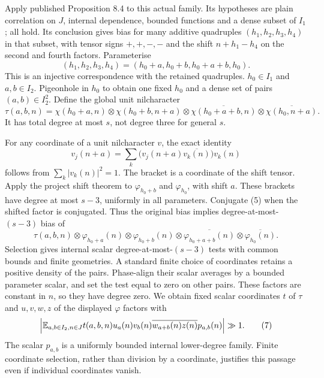 \documentclass[11pt]{article}
\begin{document}
Apply published Proposition 8.4 to this actual family. Its hypotheses are
plain correlation on $J$, internal dependence, bounded functions and a
dense subset of $I_1$; all hold. Its conclusion gives bias for many additive
quadruples $(h_1,h_2,h_3,h_4)$ in that subset, with tensor signs $+,+,-,-$
and the shift $n+h_1-h_4$ on the second and fourth factors. Parameterise
\[
 (h_1,h_2,h_3,h_4)=(h_0+a,h_0+b,h_0+a+b,h_0).
\]
This is an injective correspondence with the retained quadruples.
$h_0\in I_1$ and $a,b\in I_2$. Pigeonhole in $h_0$ to obtain one fixed
$h_0$ and a dense set of pairs $(a,b)\in I_2^2$.
Define the global unit nilcharacter
\[
 \tau(a,b,n)=\chi(h_0+a,n)\otimes\chi(h_0+b,n+a)
 \otimes\overline{\chi(h_0+a+b,n)}
 \otimes\overline{\chi(h_0,n+a)}.                         \tag{4}
\]
It has total degree at most $s$, not degree three for general $s$.

For any coordinate of a unit nilcharacter $v$, the exact identity
\[
 v_j(n+a)=\sum_k\bigl(v_j(n+a)\overline{v_k(n)}\bigr)v_k(n) \tag{5}
\]
follows from $\sum_k|v_k(n)|^2=1$. The bracket is a coordinate of the
shift tensor. Apply the project shift theorem to $\varphi_{h_0+b}$ and
$\varphi_{h_0}$, with shift $a$. These brackets have degree at most
$s-3$, uniformly in all parameters. Conjugate (5) when the shifted factor
is conjugated. Thus the original bias implies degree-at-most-$(s-3)$ bias
of
\[
 \tau(a,b,n)\otimes\varphi_{h_0+a}(n)\otimes\varphi_{h_0+b}(n)
 \otimes\overline{\varphi_{h_0+a+b}(n)}
 \otimes\overline{\varphi_{h_0}(n)}.                      \tag{6}
\]
Selection gives internal scalar degree-at-most-$(s-3)$ tests with common
bounds and finite geometries. A standard finite choice of coordinates
retains a positive density of the pairs. Phase-align their scalar averages
by a bounded parameter scalar, and set the test equal to zero on other
pairs. These factors are constant in $n$, so they have degree zero.
We obtain fixed scalar coordinates $t$ of $\tau$ and $u,v,w,z$ of the
displayed $\varphi$ factors with
\[
 \left|\mathbb E_{a,b\in I_2,n\in J}
 t(a,b,n)u_a(n)v_b(n)\overline{w_{a+b}(n)}\overline{z(n)}
 p_{a,b}(n)\right|\gg1.                                 \tag{7}
\]
The scalar $p_{a,b}$ is a uniformly bounded internal lower-degree family.
Finite coordinate selection, rather than division by a coordinate, justifies
this passage even if individual coordinates vanish.
\end{document}
